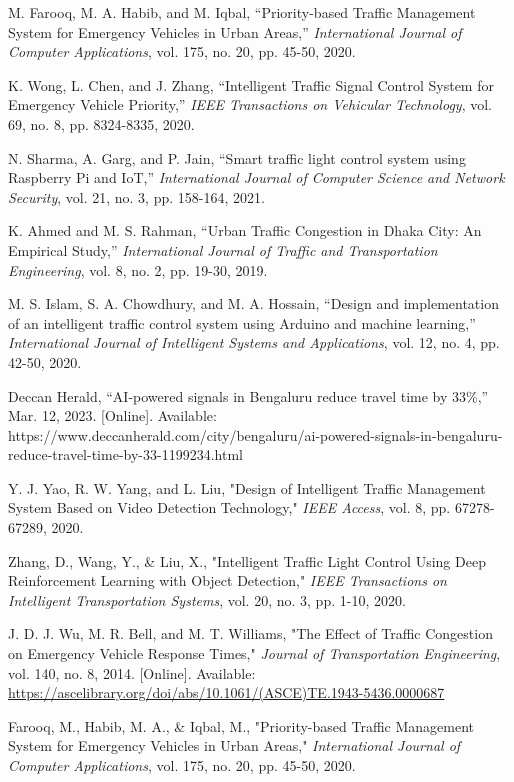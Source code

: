\begin{thebibliography}{99}
M. Farooq, M. A. Habib, and M. Iqbal, ``Priority-based Traffic Management System for Emergency Vehicles in Urban Areas,'' \textit{International Journal of Computer Applications}, vol. 175, no. 20, pp. 45-50, 2020.

K. Wong, L. Chen, and J. Zhang, ``Intelligent Traffic Signal Control System for Emergency Vehicle Priority,'' \textit{IEEE Transactions on Vehicular Technology}, vol. 69, no. 8, pp. 8324-8335, 2020.

N. Sharma, A. Garg, and P. Jain, ``Smart traffic light control system using Raspberry Pi and IoT,'' \textit{International Journal of Computer Science and Network Security}, vol. 21, no. 3, pp. 158-164, 2021.

K. Ahmed and M. S. Rahman, ``Urban Traffic Congestion in Dhaka City: An Empirical Study,'' \textit{International Journal of Traffic and Transportation Engineering}, vol. 8, no. 2, pp. 19-30, 2019.

M. S. Islam, S. A. Chowdhury, and M. A. Hossain, ``Design and implementation of an intelligent traffic control system using Arduino and machine learning,'' \textit{International Journal of Intelligent Systems and Applications}, vol. 12, no. 4, pp. 42-50, 2020.

Deccan Herald, ``AI-powered signals in Bengaluru reduce travel time by 33\%,'' Mar. 12, 2023. [Online]. Available: https://www.deccanherald.com/city/bengaluru/ai-powered-signals-in-bengaluru-reduce-travel-time-by-33-1199234.html

Y. J. Yao, R. W. Yang, and L. Liu, "Design of Intelligent Traffic Management System Based on Video Detection Technology," \textit{IEEE Access}, vol. 8, pp. 67278-67289, 2020.

Zhang, D., Wang, Y., \& Liu, X., "Intelligent Traffic Light Control Using Deep Reinforcement Learning with Object Detection," \textit{IEEE Transactions on Intelligent Transportation Systems}, vol. 20, no. 3, pp. 1-10, 2020.

J. D. J. Wu, M. R. Bell, and M. T. Williams, "The Effect of Traffic Congestion on Emergency Vehicle Response Times," \textit{Journal of Transportation Engineering}, vol. 140, no. 8, 2014. [Online]. Available: \url{https://ascelibrary.org/doi/abs/10.1061/(ASCE)TE.1943-5436.0000687}

Farooq, M., Habib, M. A., \& Iqbal, M., "Priority-based Traffic Management System for Emergency Vehicles in Urban Areas," \textit{International Journal of Computer Applications}, vol. 175, no. 20, pp. 45-50, 2020.


\end{thebibliography}
